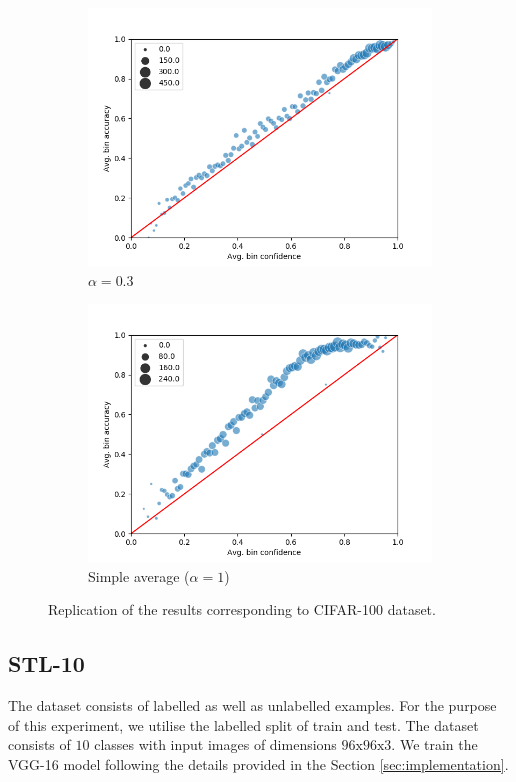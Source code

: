 \begin{figure}[h]
\begin{subfigure}[b]{0.31\textwidth}
         \centering
         \noindent\includegraphics[width=\textwidth]{images/cifar/scatterplot_0_3.png}
         \caption{$\alpha=0.3$}
     \end{subfigure}
     \begin{subfigure}[b]{0.31\textwidth}
         \centering
         \noindent\includegraphics[width=\textwidth]{images/cifar/scatterplot_1.png}
         \caption{Simple average ($\alpha=1$)}
     \end{subfigure}
        \caption{Replication of the results corresponding to CIFAR-100 dataset.}
        \label{fig:cifar100}
\end{figure}

\subsection{STL-10}
The dataset consists of labelled as well as unlabelled examples. For the purpose of this experiment, we utilise the labelled split of train and test. The dataset consists of $10$ classes with input images of dimensions $96\text{x}96\text{x}3$. We train the VGG-16 model following the details provided in the Section \ref{sec:implementation}.

